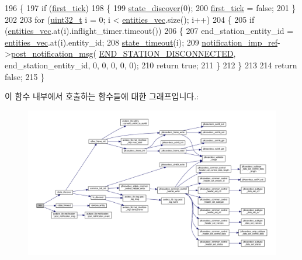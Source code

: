 \begin{DoxyCode}
196 \{
197     \textcolor{keywordflow}{if} (\hyperlink{classavdecc__lib_1_1adp__discovery__state__machine_add99975cd88f74770a569395b2633589}{first\_tick})
198     \{
199         \hyperlink{classavdecc__lib_1_1adp__discovery__state__machine_aacf39a8cb2b222d467c0b66f5f740166}{state\_discover}(0);
200         \hyperlink{classavdecc__lib_1_1adp__discovery__state__machine_add99975cd88f74770a569395b2633589}{first\_tick} = \textcolor{keyword}{false};
201     \}
202 
203     \textcolor{keywordflow}{for} (\hyperlink{parse_8c_a6eb1e68cc391dd753bc8ce896dbb8315}{uint32\_t} i = 0; i < \hyperlink{classavdecc__lib_1_1adp__discovery__state__machine_a1a3e2aa0e465f64d8e1e03f7a11556e5}{entities\_vec}.size(); i++)
204     \{
205         \textcolor{keywordflow}{if} (\hyperlink{classavdecc__lib_1_1adp__discovery__state__machine_a1a3e2aa0e465f64d8e1e03f7a11556e5}{entities\_vec}.at(i).inflight\_timer.timeout())
206         \{
207             end\_station\_entity\_id = \hyperlink{classavdecc__lib_1_1adp__discovery__state__machine_a1a3e2aa0e465f64d8e1e03f7a11556e5}{entities\_vec}.at(i).entity\_id;
208             \hyperlink{classavdecc__lib_1_1adp__discovery__state__machine_af860f46c116b2a474e2dea750ee07005}{state\_timeout}(i);
209             \hyperlink{namespaceavdecc__lib_aca078f7550e970a17b3f732c26bc3d83}{notification\_imp\_ref}->\hyperlink{classavdecc__lib_1_1notification_a2775ca78354ea78d68bf107c084b3822}{post\_notification\_msg}(
      \hyperlink{namespaceavdecc__lib_ad2a3e740ca3019cf9fd0f9514afb6419ae810005d3610d3c3347fc283c40dab40}{END\_STATION\_DISCONNECTED}, end\_station\_entity\_id, 0, 0, 0, 0, 0);
210             \textcolor{keywordflow}{return} \textcolor{keyword}{true};
211         \}
212     \}
213 
214     \textcolor{keywordflow}{return} \textcolor{keyword}{false};
215 \}
\end{DoxyCode}


이 함수 내부에서 호출하는 함수들에 대한 그래프입니다.\+:
\nopagebreak
\begin{figure}[H]
\begin{center}
\leavevmode
\includegraphics[width=350pt]{classavdecc__lib_1_1adp__discovery__state__machine_a063a844446a392e15240a9cf4a771818_cgraph}
\end{center}
\end{figure}




